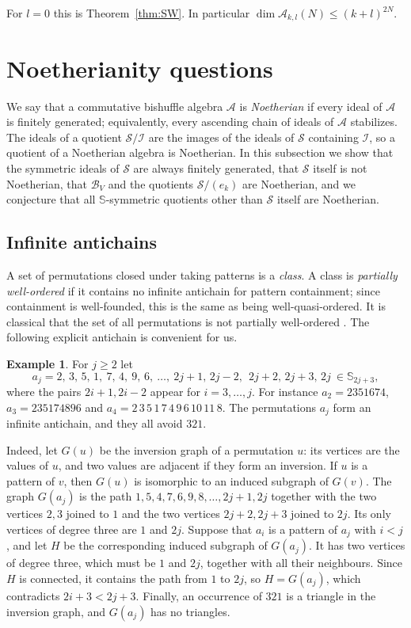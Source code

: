 \documentclass[11pt]{amsart}
\theoremstyle{definition}
\newtheorem{example}[theorem]{Example}
\theoremstyle{remark}
\newcommand{\bS}{\mathbb{S}}
\newcommand{\cA}{\mathscr{A}}
\newcommand{\cB}{\mathcal{B}}
\newcommand{\cI}{\mathscr{I}}
\newcommand{\cS}{\mathscr{S}}
\begin{document}
For $l=0$ this is Theorem~\ref{thm:SW}. In particular $\dim\cA_{k,l}(N)\le(k+l)^{2N}$.

\section{Noetherianity questions}\label{sec:noeth}

We say that a commutative bishuffle algebra $\cA$ is \emph{Noetherian} if every ideal of $\cA$ is finitely generated; equivalently, every ascending chain of ideals of $\cA$ stabilizes. The ideals of a quotient $\cS/\cI$ are the images of the ideals of $\cS$ containing $\cI$, so a quotient of a Noetherian algebra is Noetherian. In this subsection we show that the symmetric ideals of $\cS$ are always finitely generated, that $\cS$ itself is not Noetherian, that $\cB_V$ and the quotients $\cS/(e_k)$ are Noetherian, and we conjecture that all $\bS$-symmetric quotients other than $\cS$ itself are Noetherian.



\subsection{Infinite antichains}

A set of permutations closed under taking patterns is a \emph{class}. A class is \emph{partially well-ordered} if it contains no infinite antichain for pattern containment; since containment is well-founded, this is the same as being well-quasi-ordered. It is classical that the set of all permutations is not partially well-ordered \cite{SB,AMR,Vatter}. The following explicit antichain is convenient for us.

\begin{example}\label{ex:antichain}
For $j\ge2$ let
\[
a_j=2,\,3,\,5,\,1,\ 7,\,4,\ 9,\,6,\ \dots,\ 2j+1,\,2j-2,\ \ 2j+2,\,2j+3,\,2j\ \in\bS_{2j+3},
\]
where the pairs $2i+1,2i-2$ appear for $i=3,\dots,j$. For instance $a_2=2351674$, $a_3=235174896$ and $a_4=2\,3\,5\,1\,7\,4\,9\,6\,10\,11\,8$. The permutations $a_j$ form an infinite antichain, and they all avoid $321$.

Indeed, let $G(u)$ be the inversion graph of a permutation $u$: its vertices are the values of $u$, and two values are adjacent if they form an inversion. If $u$ is a pattern of $v$, then $G(u)$ is isomorphic to an induced subgraph of $G(v)$. The graph $G(a_j)$ is the path $1,5,4,7,6,9,8,\dots,2j+1,2j$ together with the two vertices $2,3$ joined to $1$ and the two vertices $2j+2,2j+3$ joined to $2j$. Its only vertices of degree three are $1$ and $2j$. Suppose that $a_i$ is a pattern of $a_j$ with $i<j$, and let $H$ be the corresponding induced subgraph of $G(a_j)$. It has two vertices of degree three, which must be $1$ and $2j$, together with all their neighbours. Since $H$ is connected, it contains the path from $1$ to $2j$, so $H=G(a_j)$, which contradicts $2i+3<2j+3$. Finally, an occurrence of $321$ is a triangle in the inversion graph, and $G(a_j)$ has no triangles.
\end{example}
\end{document}
